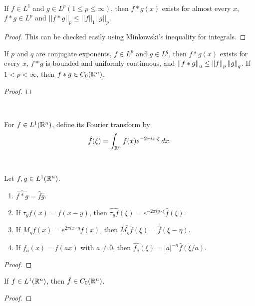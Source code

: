 \begin{proposition}\ \par
    If $f\in L^1$ and $g\in L^p(1\leq p \leq \infty)$, then $f*g(x)$ exists for almost every $x$, $f*g \in L^p$ and $||f*g||_p \leq ||f||_1||g||_p$.
\end{proposition}
\begin{proof}
    This can be checked easily using Minkowski's inequality for integrals.
\end{proof}

\begin{proposition}
    If $p$ and $q$ are conjugate exponents, $f\in L^p$ and $g\in L^q$, then $f*g(x)$ exists for every $x$, $f*g$ is bounded and uniformly continuous, and $\left\lVert{f*g}\right\rVert_u \leq \left\lVert{f}\right\rVert_p\left\lVert{g}\right\rVert_q$. If $1<p<\infty$, then $f*g \in C_0(\mathbb{R}^n)$.
\end{proposition}
\begin{proof}
    
\end{proof}

\begin{definition}\ \par
    For $f\in L^1(\mathbb{R}^n)$, define its Fourier transform by
    \[
    \hat{f}(\xi) = \int_{\mathbb{R}^n} f(x)e^{-2\pi i x\cdot \xi}\,dx.
    \]
\end{definition}

\begin{proposition}\ \par
    Let $f,g\in L^1(\mathbb{R}^n)$.
    \begin{enumerate}
        \item $\widehat{f*g} = \hat{f}\hat{g}$.
        \item If $\tau_y f(x)=f(x-y)$, then $\widehat{\tau_y f}(\xi)=e^{-2\pi i y\cdot \xi}\hat{f}(\xi)$.
        \item If $M_\eta f(x)=e^{2\pi i x\cdot \eta}f(x)$, then $\widehat{M_\eta f}(\xi)=\hat{f}(\xi-\eta)$.
        \item If $f_a(x)=f(ax)$ with $a\neq 0$, then $\widehat{f_a}(\xi)=|a|^{-n}\hat{f}(\xi/a)$.
    \end{enumerate}
\end{proposition}
\begin{proof}
    
\end{proof}

\begin{proposition}
    If $f\in L^1(\mathbb{R}^n)$, then $\hat{f}\in C_0(\mathbb{R}^n)$.
\end{proposition}
\begin{proof}
    
\end{proof}

